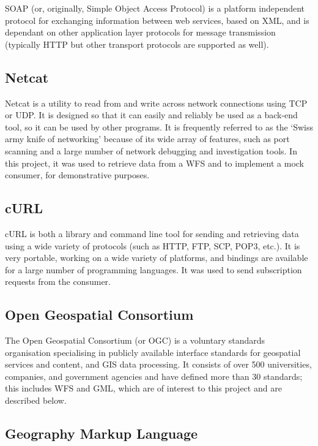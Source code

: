 \documentclass[a4paper, 12pt, twoside]{article}
\begin{document}
SOAP (or, originally, Simple Object Access Protocol) is a platform independent protocol for exchanging information between web services, based on XML, and is dependant on other application layer protocols for message transmission (typically HTTP but other transport protocols are supported as well)\cite{curbera2002unraveling}.

\subsection{Netcat}
\label{sec:bg_netcat}

Netcat is a utility to read from and write across network connections using TCP or UDP. It is designed so that it can easily and reliably be used as a back-end tool, so it can be used by other programs. It is frequently referred to as the `Swiss army knife of networking' because of its wide array of features, such as port scanning and a large number of network debugging and investigation tools. In this project, it was used to retrieve data from a WFS and to implement a mock consumer, for demonstrative purposes.

\subsection{cURL}
\label{sec:bg_curl}

cURL is both a library and command line tool for sending and retrieving data using a wide variety of protocols (such as HTTP, FTP, SCP, POP3, etc.). It is very portable, working on a wide variety of platforms, and bindings are available for a large number of programming languages. It was used to send subscription requests from the consumer.

\subsection{Open Geospatial Consortium}
\label{sec:bg_ogc}

The Open Geospatial Consortium (or OGC) is a voluntary standards organisation specialising in publicly available interface standards for geospatial services and content, and GIS data processing. It consists of over 500 universities, companies, and government agencies and have defined more than 30 standards; this includes WFS and GML, which are of interest to this project and are described below.

\subsection{Geography Markup Language}
\label{sec:bg_gml}
\end{document}
